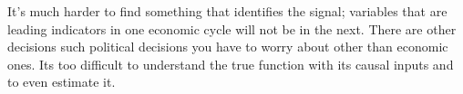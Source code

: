 \documentclass[12pt]{article}
\begin{document}
\begin{enumerate}
It’s much harder to find something that identifies the signal; variables that are leading indicators in one economic cycle will not be in the next. There are other decisions such political decisions you have to worry about other than economic ones. Its too difficult to understand the true function with its causal inputs and to even estimate it.



\end{enumerate}

\end{document}
